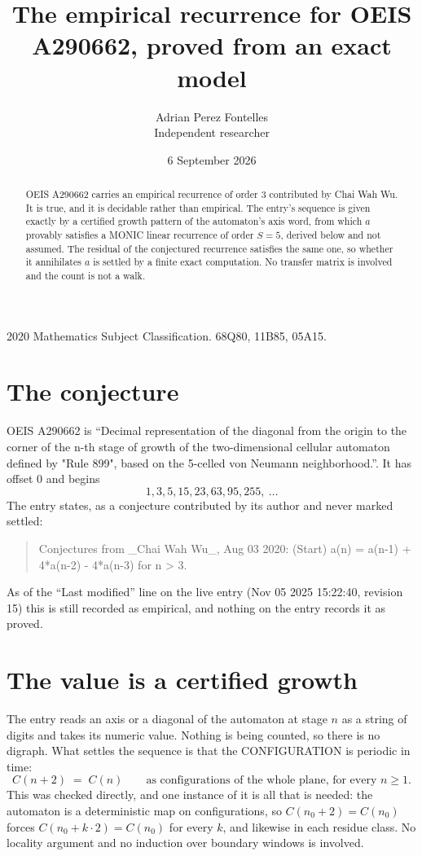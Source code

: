 \documentclass[11pt,a4paper]{article}
\title{The empirical recurrence for OEIS A290662, proved from an exact model}
\author{Adrian Perez Fontelles\\ \small Independent researcher}
\date{6 September 2026}
\theoremstyle{plain}
\theoremstyle{definition}
\begin{document}
\maketitle

\begin{abstract}
OEIS A290662 carries an empirical recurrence of order $3$ contributed by Chai Wah Wu. It is true, and it is
decidable rather than empirical. The entry's sequence is given exactly by a certified growth pattern of the automaton's axis word, from
which $a$ provably satisfies a MONIC linear recurrence of order $S=5$, derived below and not
assumed. The residual of the conjectured recurrence satisfies the same one, so whether it
annihilates $a$ is settled by a finite exact computation. No transfer matrix is involved and
the count is not a walk.
\end{abstract}

\noindent\small 2020 Mathematics Subject Classification. 68Q80, 11B85, 05A15.\normalsize

\section{The conjecture}

OEIS A290662 is ``Decimal representation of the diagonal from the origin to the corner of the n-th stage of growth of the two-dimensional cellular automaton defined by "Rule 899", based on the 5-celled von Neumann neighborhood.''. It has offset $0$ and begins
\[
1, 3, 5, 15, 23, 63, 95, 255,\ \dots
\]
The entry states, as a conjecture contributed by its author and never marked settled:
\begin{quote}
Conjectures from \_Chai Wah Wu\_, Aug 03 2020: (Start) a(n) = a(n-1) + 4*a(n-2) - 4*a(n-3) for n > 3.
\end{quote}
As of the ``Last modified'' line on the live entry (Nov 05 2025 15:22:40, revision 15)
this is still recorded as empirical, and nothing on the entry records it as proved.

\section{The value is a certified growth}

The entry reads an axis or a diagonal of the automaton at stage $n$ as a string of digits and
takes its numeric value. Nothing is being counted, so there is no digraph. What settles the
sequence is that the CONFIGURATION is periodic in time:
\[
C(n+2)\;=\;C(n)\qquad\text{as configurations of the whole plane, for every } n\ge 1.
\]
This was checked directly, and one instance of it is all that is needed: the automaton is a
deterministic map on configurations, so $C(n_0+2)=C(n_0)$ forces $C(n_0+k\cdot2)=C(n_0)$ for
every $k$, and likewise in each residue class. No locality argument and no induction over
boundary windows is involved.
\end{document}
